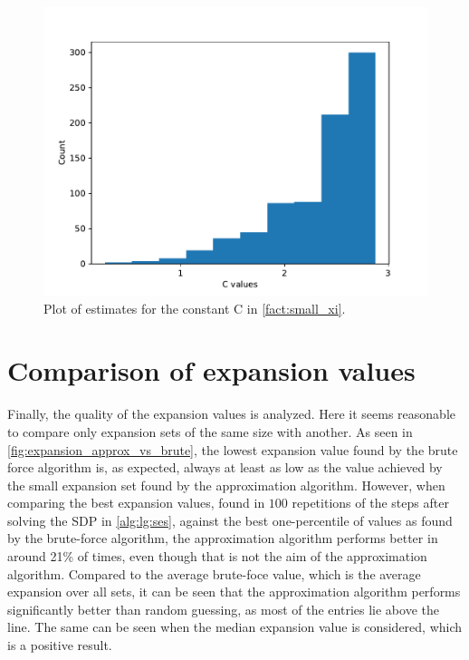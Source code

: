 \begin{figure}
	\centering
	\includegraphics[scale=1]{figures/quality_evaluation_log_C_estimates.pdf}
	\caption[Plot C estimates]{Plot of estimates for the constant C in \cref{fact:small_xi}.\label{fig:c_estimates}}
\end{figure}





\section{Comparison of expansion values}




Finally, the quality of the expansion values is analyzed. Here it seems reasonable to compare only expansion sets of the same size with another. As seen in \cref{fig:expansion_approx_vs_brute}, the lowest expansion value found by the brute force algorithm is, as expected, always at least as low as the value achieved by the small expansion set found by the approximation algorithm. However, when comparing the best expansion values, found in $100$ repetitions of the steps after solving the SDP in \cref{alg:lg:ses}, against the best one-percentile of values as found by the brute-force algorithm, the approximation algorithm performs better in around 21\% of times, even though that is not the aim of the approximation algorithm. Compared to the average brute-foce value, which is the average expansion over all sets, it can be seen that the approximation algorithm performs significantly better than random guessing, as most of the entries lie above the line. The same can be seen when the median expansion value is considered, which is a positive result. 

